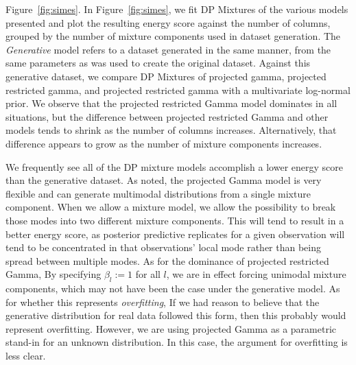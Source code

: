 Figure~\ref{fig:simes}. In Figure~\ref{fig:simes}, we fit DP Mixtures of the various models presented
  and plot the resulting energy score against the number of columns, grouped by the number of mixture
  components used in dataset generation.  The \emph{Generative} model refers to a dataset generated
  in the same manner, from the same parameters as was used to create the original dataset.  Against
  this generative dataset, we compare DP Mixtures of projected gamma, projected restricted gamma, and
  projected restricted gamma with a multivariate log-normal prior.  We observe that the projected
  restricted Gamma model dominates in all situations, but the difference between projected restricted
  Gamma and other models tends to shrink as the number of columns increases.  Alternatively, that
  difference appears to grow as the number of mixture components increases.

We frequently see all of the DP mixture models accomplish a lower energy score than the generative
  dataset.  As \cite{nunez2019} noted, the projected Gamma model is very flexible and can generate
  multimodal distributions from a single mixture component.  When we allow a mixture model, we allow
  the possibility to break those modes into two different mixture components.  This will tend to
  result in a better energy score, as posterior predictive replicates for a given observation will
  tend to be concentrated in that observations' local mode rather than being spread between multiple
  modes.  As for the dominance of projected restricted Gamma, By specifying $\beta_l := 1$ for all
  $l$, we are in effect forcing unimodal mixture components, which may not have been the case under
  the generative model.  As for whether this represents \emph{overfitting}, If we had reason to
  believe that the generative distribution for real data followed this form, then this probably would
  represent overfitting.  However, we are using projected Gamma as a parametric stand-in for an unknown
  distribution.  In this case, the argument for overfitting is less clear.

